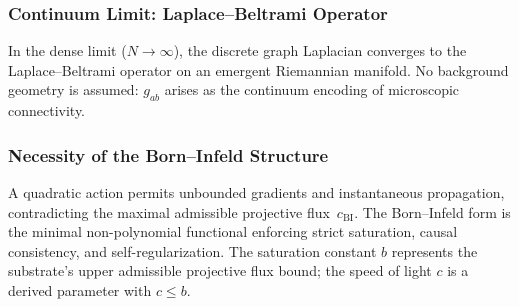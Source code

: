   \subsubsection*{Continuum Limit: Laplace--Beltrami Operator}
    \label{subsec:A12-continuum-limit}

    In the dense limit ($N \to \infty$), the discrete graph Laplacian
    converges to the Laplace--Beltrami operator on an emergent Riemannian
    manifold.
    No background geometry is assumed: $g_{ab}$ arises as the continuum
    encoding of microscopic connectivity.

  \subsubsection*{Necessity of the Born--Infeld Structure}
    \label{subsec:A12-born-infeld-necessity}

    A quadratic action permits unbounded gradients and instantaneous
    propagation, contradicting the maximal admissible projective flux~$c_{\mathrm{BI}}$.
    The Born--Infeld form is the minimal non-polynomial functional
    enforcing strict saturation, causal consistency, and
    self-regularization.
    The saturation constant $b$ represents the substrate's upper admissible
    projective flux bound; the speed of light $c$ is a derived parameter
    with $c \le b$.
